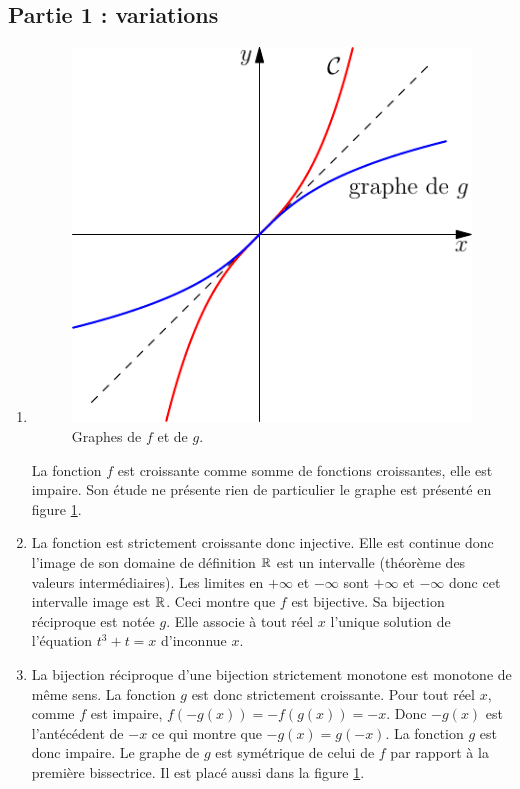 \subsection*{Partie 1 : variations}
\begin{enumerate}
 \item 
\begin{figure}[h!]
 \centering
 \includegraphics{Capproxrec_1.pdf}
 \caption{Graphes de $f$ et de $g$.}
 \label{fig:Capproxrec_1}
\end{figure}
La fonction $f$ est croissante comme somme de fonctions croissantes, elle est impaire. Son étude ne présente rien de particulier le graphe est présenté en figure \ref{fig:Capproxrec_1}.
 \item La fonction est strictement croissante donc injective. Elle est continue donc l'image de son domaine de définition $\mathbb{R}$ est un intervalle (théorème des valeurs intermédiaires). Les limites en $+\infty$ et $-\infty$ sont $+\infty$ et $-\infty$ donc cet intervalle image est $\mathbb{R}$. Ceci montre que $f$ est bijective. Sa bijection réciproque est notée $g$. Elle associe à tout réel $x$ l'unique solution de l'équation $t^3+t=x$ d'inconnue $x$. 
 
 \item La bijection réciproque d'une bijection strictement monotone est monotone de même sens. La fonction $g$ est donc strictement croissante.\newline
Pour tout réel $x$, comme $f$ est impaire, $f(-g(x))=-f(g(x))=-x$. Donc $-g(x)$ est l'antécédent de $-x$ ce qui montre que $-g(x)=g(-x)$. La fonction $g$ est donc impaire. Le graphe de $g$ est symétrique de celui de $f$ par rapport à la première bissectrice. Il est placé aussi dans la figure \ref{fig:Capproxrec_1}.


\end{enumerate}
